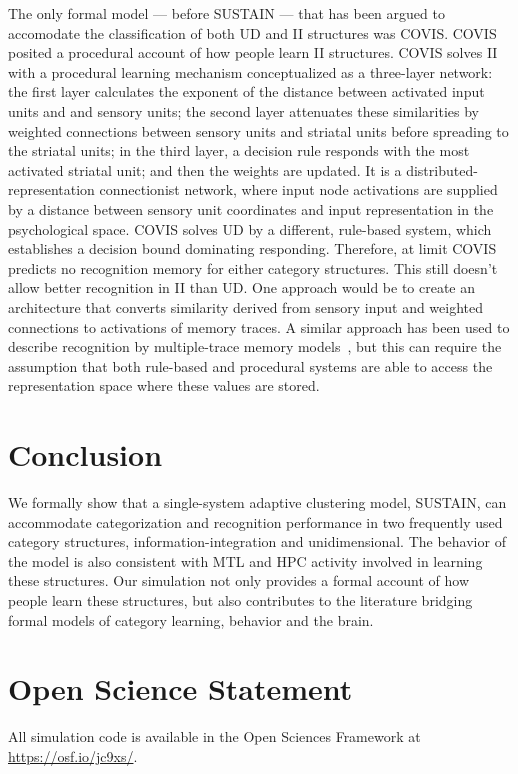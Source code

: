 \documentclass[10pt,letterpaper]{article}
\begin{document}
The only formal model --- before SUSTAIN --- that has been argued to accomodate
the classification of both UD and II structures was COVIS. COVIS posited
a procedural account of how people learn II structures. COVIS solves II
with a procedural learning mechanism conceptualized as a three-layer network:
the first layer calculates the exponent
of the distance between activated input units and and sensory units;
the second layer attenuates these similarities by weighted connections
between sensory units and striatal units before spreading to the striatal units;
in the third layer, a decision rule responds with the most activated striatal unit;
and then the weights are updated.
It is a distributed-representation connectionist network, where input
node activations are supplied by a distance between sensory unit coordinates
and input representation in the psychological space. COVIS solves
UD by a different, rule-based system, which establishes a decision bound dominating responding.
Therefore, at limit COVIS predicts no recognition memory
for either category structures. This still doesn't allow better recognition
in II than UD. One approach
would be to create an architecture that converts similarity derived from
sensory input and weighted connections to activations of memory traces.
A similar approach has been used to describe recognition by multiple-trace
memory models~\cite{hintzman1986schema}, but this can require the assumption
that both rule-based and procedural
systems are able to access the representation space where these values are
stored.

\section{Conclusion}

We formally show that a single-system adaptive clustering model, SUSTAIN,
can accommodate categorization and recognition performance in two frequently
used category structures, information-integration and unidimensional.
The behavior of the model is also consistent with MTL and HPC activity involved
in learning these structures. Our simulation not only provides a formal
account of how people learn these structures, but also contributes to the
literature bridging formal models of category learning, behavior and the
brain.

\section{Open Science Statement}
All simulation code is available in the Open Sciences Framework at
\url{https://osf.io/jc9xs/}.



\setlength{\bibleftmargin}{.125in}
\setlength{\bibindent}{-\bibleftmargin}


\end{document}
